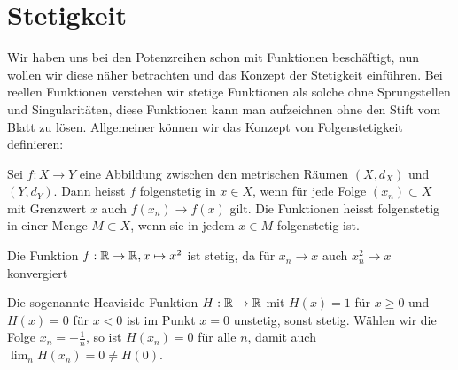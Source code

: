 \chapter{Stetigkeit}
\label{\detokenize{stetigkeit/stetigkeit:stetigkeit}}\label{\detokenize{stetigkeit/stetigkeit::doc}}
Wir haben uns bei den Potenzreihen schon mit Funktionen beschäftigt, nun wollen wir diese näher betrachten und das Konzept der Stetigkeit einführen. Bei reellen Funktionen verstehen wir stetige Funktionen als solche ohne Sprungstellen und Singularitäten, diese Funktionen kann man aufzeichnen ohne den Stift vom Blatt zu lösen. Allgemeiner können wir das Konzept von Folgenstetigkeit definieren:
\label{stetigkeit/stetigkeit:definition-0}
\begin{definition}{}{}



Sei \(f: X \rightarrow Y\) eine Abbildung zwischen den metrischen Räumen \((X,d_X)\) und \((Y,d_Y)\). Dann heisst \(f\) folgenstetig in \(x \in X\), wenn für jede Folge \((x_n) \subset X\) mit Grenzwert \(x\) auch \(f(x_n) \rightarrow f(x)\) gilt. Die Funktionen heisst folgenstetig in einer Menge \(M \subset X\), wenn sie in jedem \(x \in M\) folgenstetig ist.
\end{definition}
\label{stetigkeit/stetigkeit:example-1}
\begin{example}{}{}



Die Funktion \(f: \mathbb{R} \rightarrow \mathbb{R}, x \mapsto x^2\) ist stetig, da für \(x_n \rightarrow x\) auch \(x_n^2 \rightarrow x\) konvergiert
\end{example}
\label{stetigkeit/stetigkeit:example-2}
\begin{example}{}{}



Die sogenannte Heaviside Funktion \(H: \mathbb{R} \rightarrow \mathbb{R}\) mit \(H(x) = 1\) für \(x \geq 0\) und \(H(x)=0\) für \(x < 0\) ist im Punkt \(x =0\) unstetig, sonst stetig. Wählen wir die Folge \(x_n = -\frac{1}n\), so ist \(H(x_n) = 0\) für alle \(n\), damit auch \(\lim_n H(x_n) = 0 \neq H(0)\).
\end{example}

